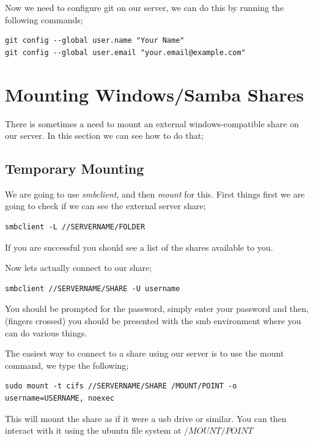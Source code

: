 Now we need to configure git on our server, we can do this by running the following commands;

\begin{lstlisting}
git config --global user.name "Your Name"
git config --global user.email "your.email@example.com"
\end{lstlisting}

\section{Mounting Windows/Samba Shares}
\label{sec:mount_samba}

There is sometimes a need to mount an external windows-compatible share on our server.  In this section we can see how to do that;

\subsection{Temporary Mounting}

We are going to use \textit{smbclient}, and then \textit{mount} for this.  First things first we are going to check if we can see the external server share;

\begin{lstlisting}
smbclient -L //SERVERNAME/FOLDER
\end{lstlisting}

If you are successful you should see a list of the shares available to you.

Now lets actually connect to our share;

\begin{lstlisting}
smbclient //SERVERNAME/SHARE -U username
\end{lstlisting}

You should be prompted for the password, simply enter your password and then, (fingers crossed) you should be presented with the smb environment where you can do various things.

The easiest way to connect to a share using our server is to use the mount command, we type the following;

\begin{lstlisting}
sudo mount -t cifs //SERVERNAME/SHARE /MOUNT/POINT -o username=USERNAME, noexec
\end{lstlisting}

This will mount the share as if it were a usb drive or similar.  You can then interact with it using the ubuntu file system at $/MOUNT/POINT$

